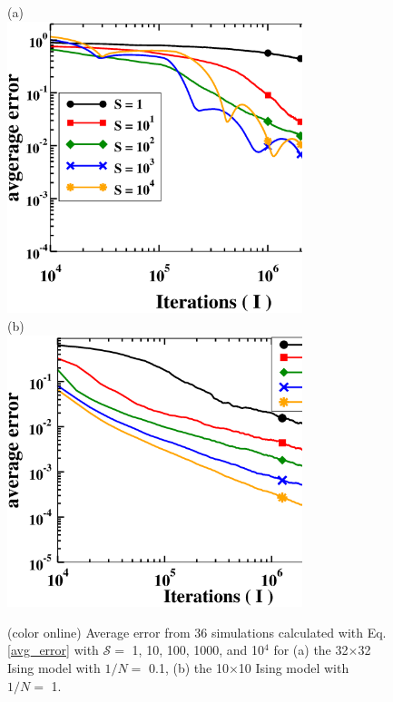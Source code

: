 \documentclass[aps,pre,reprint,superscriptaddress,showkeys]{revtex4-2}
\begin{document}
\begin{figure}[h!]
(a)\\
\vspace{1cm}
\includegraphics[width=8.6cm]{fig1a.eps}\\
\vspace{1cm}
(b)\\
\vspace{1cm}
\includegraphics[width=8.6cm]{fig1b.eps}\\
\caption{(color online) Average error from 36 simulations calculated with Eq. \ref{avg_error} with $\mathcal{S}=$ 1, 10, 100, 1000, and 10$^4$ for  (a) the 32$\times$32 Ising model with $1/N=$ 0.1, (b) the 10$\times$10 Ising model with $1/N =$ 1. \label{thirtytwo_Stest} }
\end{figure}
\end{document}
